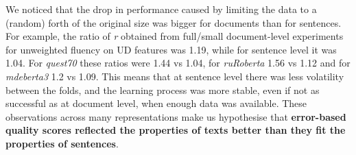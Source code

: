 We noticed that the drop in performance caused by limiting the data to a (random) forth of the original size was bigger for documents than for sentences. For example, the ratio of \textit{r} obtained from full/small document-level experiments for unweighted fluency on UD features was 1.19, while for sentence level it was 1.04. For \textit{quest70} these ratios were 1.44 vs 1.04, for \textit{ruRoberta} 1.56 vs 1.12 and for \textit{mdeberta3} 1.2 vs 1.09.
This means that at sentence level there was less volatility between the folds, and the learning process was more stable, even if not as successful as at document level, when enough data was available. 
These observations across many representations make us hypothesise that \textbf{error-based quality scores reflected the properties of texts better than they fit the properties of sentences}. 
